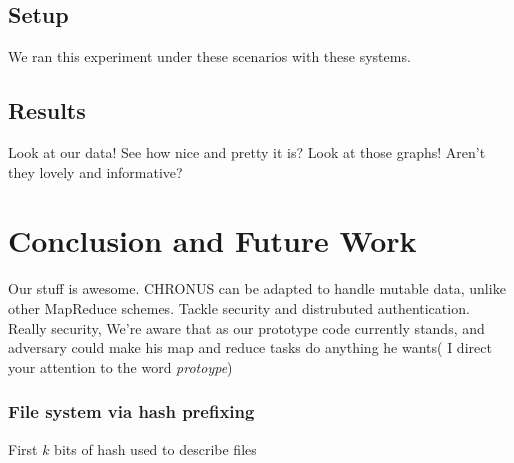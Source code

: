 \documentclass[conference, compsocconf, letterpaper]{IEEEtran}
\begin{document}
\subsection{Setup}
We ran this experiment under these scenarios with these systems.

\subsection{Results}
Look at our data! See how nice and pretty it is?  Look at those graphs!  Aren't they lovely and informative? 


\section{Conclusion and Future Work}
Our stuff \cite{code} is awesome.
CHRONUS can be adapted to handle mutable data, unlike other MapReduce schemes.
Tackle security and distrubuted authentication.
Really security,  We're aware that as our prototype code currently stands, and adversary could make his map and reduce tasks do anything he wants(   I direct your attention to the word \emph{protoype})


\subsubsection{File system via hash prefixing}
First $k$ bits of hash used to describe files




\end{document}
